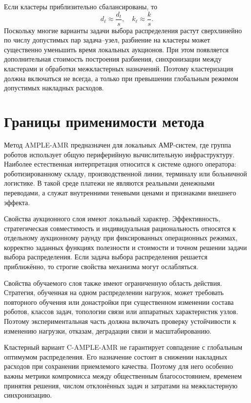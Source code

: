 Если кластеры приблизительно сбалансированы, то
\begin{equation}
    d_\ell \approx \frac{d_t}{s}, \quad k_\ell \approx \frac{k}{s}.
    \label{eq:ch5_balanced_clusters}
\end{equation}
Поскольку многие варианты задачи выбора распределения растут сверхлинейно по числу допустимых пар задача--узел, разбиение на кластеры может существенно уменьшить время локальных аукционов. При этом появляется дополнительная стоимость построения разбиения, синхронизации между кластерами и обработки межкластерных назначений. Поэтому кластеризация должна включаться не всегда, а только при превышении глобальным режимом допустимых накладных расходов.

\section{Границы применимости метода}

Метод AMPLE-AMR предназначен для локальных АМР-систем, где группа роботов использует общую периферийную вычислительную инфраструктуру. Наиболее естественная интерпретация относится к системе одного оператора: роботизированному складу, производственной линии, терминалу или больничной логистике. В такой среде платежи не являются реальными денежными переводами, а служат внутренними теневыми ценами и признаками внешнего эффекта.

Свойства аукционного слоя имеют локальный характер. Эффективность, стратегическая совместимость и индивидуальная рациональность относятся к отдельному аукционному раунду при фиксированных операционных режимах, корректно заданных функциях полезности и стоимости и точном решении задачи выбора распределения. Если задача выбора распределения решается приближённо, то строгие свойства механизма могут ослабляться.

Свойства обучаемого слоя также имеют ограниченную область действия. Стратегия, обученная на одном распределении нагрузок, может требовать повторного обучения или донастройки при существенном изменении состава роботов, классов задач, топологии связи или аппаратных характеристик узлов. Поэтому экспериментальная часть должна включать проверку устойчивости к изменению нагрузки, отказам, деградации связи и масштабированию.

Кластерный вариант C-AMPLE-AMR не гарантирует совпадение с глобальным оптимумом распределения. Его назначение состоит в снижении накладных расходов при сохранении приемлемого качества. Поэтому для него особенно важны метрики компромисса между общественным благосостоянием, временем принятия решения, числом отклонённых задач и затратами на межкластерную синхронизацию.

